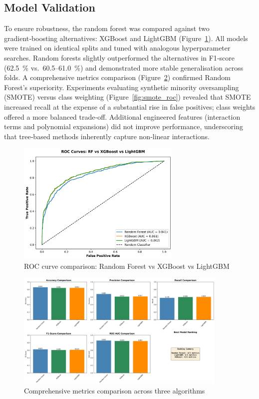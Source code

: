 \documentclass[12pt]{article}
\begin{document}
\subsection{Model Validation}
To ensure robustness, the random forest was compared against two gradient‑boosting alternatives: XGBoost and LightGBM (Figure~\ref{fig:model_comparison}).  All models were trained on identical splits and tuned with analogous hyperparameter searches.  Random forests slightly outperformed the alternatives in F1‑score (62.5~\% vs.\ 60.5–61.0~\%) and demonstrated more stable generalisation across folds.  A comprehensive metrics comparison (Figure~\ref{fig:metrics_comparison}) confirmed Random Forest's superiority.  Experiments evaluating synthetic minority oversampling (SMOTE) versus class weighting (Figure~\ref{fig:smote_roc}) revealed that SMOTE increased recall at the expense of a substantial rise in false positives; class weights offered a more balanced trade‑off.  Additional engineered features (interaction terms and polynomial expansions) did not improve performance, underscoring that tree‑based methods inherently capture non‑linear interactions.

\begin{figure}[H]
\centering
\includegraphics[width=0.7\textwidth]{img/21_model_comparison_roc.png}
\caption{ROC curve comparison: Random Forest vs XGBoost vs LightGBM}
\label{fig:model_comparison}
\end{figure}

\begin{figure}[H]
\centering
\includegraphics[width=0.9\textwidth]{img/24_model_comparison_metrics.png}
\caption{Comprehensive metrics comparison across three algorithms}
\label{fig:metrics_comparison}
\end{figure}
\end{document}
